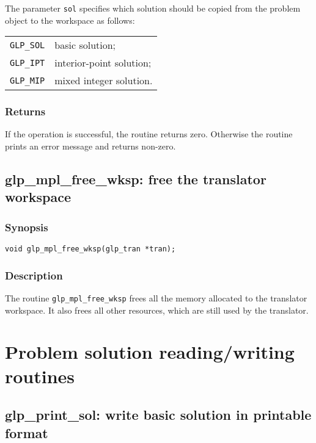 The parameter \verb|sol| specifies which solution should be copied
from the problem object to the workspace as follows:

\begin{tabular}{@{}ll}
\verb|GLP_SOL| & basic solution; \\
\verb|GLP_IPT| & interior-point solution; \\
\verb|GLP_MIP| & mixed integer solution. \\
\end{tabular}

\subsubsection*{Returns}

If the operation is successful, the routine returns zero. Otherwise
the routine prints an error message and returns non-zero.

\subsection{glp\_mpl\_free\_wksp: free the translator workspace}

\subsubsection*{Synopsis}

\begin{verbatim}
void glp_mpl_free_wksp(glp_tran *tran);
\end{verbatim}

\subsubsection*{Description}

The routine \verb|glp_mpl_free_wksp| frees all the memory allocated to
the translator workspace. It also frees all other resources, which are
still used by the translator.


\newpage

\section{Problem solution reading/writing routines}

\subsection{glp\_print\_sol: write basic solution in printable format}

